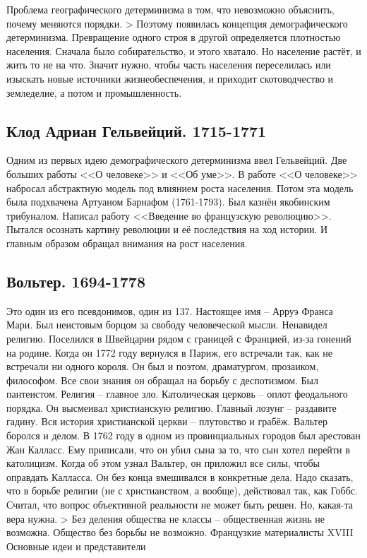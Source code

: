 Проблема географического детерминизма в том, что невозможно объяснить, почему меняются порядки. > Поэтому появилась концепция демографического детерминизма. Превращение одного строя в другой определяется плотностью населения. Сначала было собирательство, и этого хватало. Но население растёт, и жить то не на что. Значит нужно, чтобы часть населения переселилась или изыскать новые источники жизнеобеспечения, и приходит скотоводчество и земледелие, а потом и промышленность.
\subsection{ Клод Адриан Гельвейций. 1715-1771 }

Одним из первых идею демографического детерминизма ввел Гельвейций. Две больших работы <<О человеке>> и <<Об уме>>. В работе <<О человеке>> набросал абстрактную модель под влиянием роста населения. Потом эта модель была подхвачена Артуаном Барнафом (1761-1793). Был казнён якобинским трибуналом. Написал работу <<Введение во французскую революцию>>. Пытался осознать картину революции и её последствия на ход истории. И главным образом обращал внимания на рост населения.
\subsection{ Вольтер. 1694-1778 }

Это один из его псевдонимов, один из 137. Настоящее имя – Арруэ Франса Мари. Был неистовым борцом за свободу человеческой мысли. Ненавидел религию. Поселился в Швейцарии рядом с границей с Францией, из-за гонений на родине. Когда он 1772 году вернулся в Париж, его встречали так, как не встречали ни одного короля. Он был и поэтом, драматургом, прозаиком, философом. Все свои знания он обращал на борьбу с деспотизмом. Был пантеистом. Религия – главное зло. Католическая церковь – оплот феодального порядка. Он высмеивал христианскую религию. Главный лозунг – раздавите гадину. Вся история христианской церкви – плутовство и грабёж. Вальтер боролся и делом. В 1762 году в одном из провинциальных городов был арестован Жан Калласс. Ему приписали, что он убил сына за то, что сын хотел перейти в католицизм. Когда об этом узнал Вальтер, он приложил все силы, чтобы оправдать Калласса. Он без конца вмешивался в конкретные дела. Надо сказать, что в борьбе религии (не с христианством, а вообще), действовал так, как Гоббс. Считал, что вопрос объективной реальности не может быть решен. Но, какая-та вера нужна. > Без деления общества не классы – общественная жизнь не возможна. Общество без борьбы не возможно.
Французкие материалисты XVIII
Основные идеи и представители

